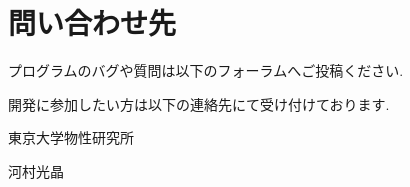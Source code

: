\documentclass[letterpaper,10pt,dvipdfmx,openany]{sphinxmanual}
\begin{document}
\sphinxstepscope


\chapter{問い合わせ先}
\label{\detokenize{contact:id1}}\label{\detokenize{contact::doc}}
\sphinxAtStartPar
プログラムのバグや質問は以下のフォーラムへご投稿ください.

\sphinxAtStartPar
{}

\sphinxAtStartPar
開発に参加したい方は以下の連絡先にて受け付けております.

\sphinxAtStartPar
東京大学物性研究所

\sphinxAtStartPar
河村光晶

\sphinxAtStartPar
{}



\renewcommand{\indexname}{索引}
\printindex
\end{document}
